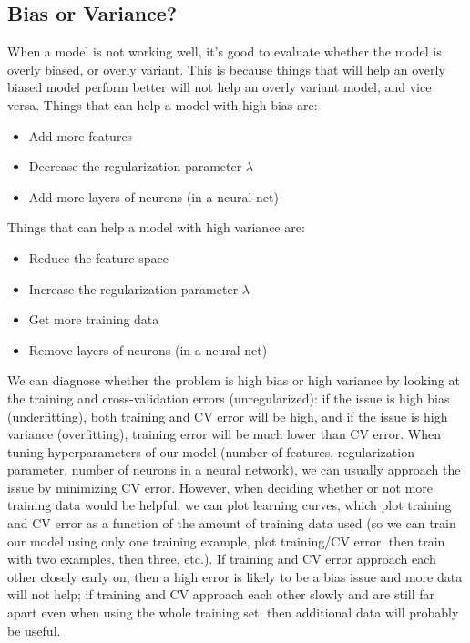 \documentclass{article}
\begin{document}
\subsection{Bias or Variance?}
When a model is not working well, it's good to evaluate whether the model is overly biased, or overly variant. This is because things that will help an overly biased model perform better will not help an overly variant model, and vice versa. Things that can help a model with high bias are:
\begin{itemize}
\item Add more features
\item Decrease the regularization parameter $\lambda$
\item Add more layers of neurons (in a neural net)
\end{itemize}
Things that can help a model with high variance are:
\begin{itemize}
\item Reduce the feature space
\item Increase the regularization parameter $\lambda$
\item Get more training data
\item Remove layers of neurons (in a neural net)
\end{itemize}
We can diagnose whether the problem is high bias or high variance by looking at the training and cross-validation errors (unregularized): if the issue is high bias (underfitting), both training and CV error will be high, and if the issue is high variance (overfitting), training error will be much lower than CV error. When tuning hyperparameters of our model (number of features, regularization parameter, number of neurons in a neural network), we can usually approach the issue by minimizing CV error. However, when deciding whether or not more training data would be helpful, we can plot learning curves, which plot training and CV error as a function of the amount of training data used (so we can train our model using only one training example, plot training/CV error, then train with two examples, then three, etc.). If training and CV error approach each other closely early on, then a high error is likely to be a bias issue and more data will not help; if training and CV approach each other slowly and are still far apart even when using the whole training set, then additional data will probably be useful.
\end{document}
